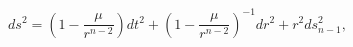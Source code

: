\begin{equation}
ds^{2}=\left(1-\frac{\mu}{r^{n-2}}\right)
dt^{2}+\left(1-\frac{\mu}{r^{n-2}}\right)^{-1}dr^{2}+r^{2}ds_{n-1}^{2},
\label{schd}
\end{equation}

